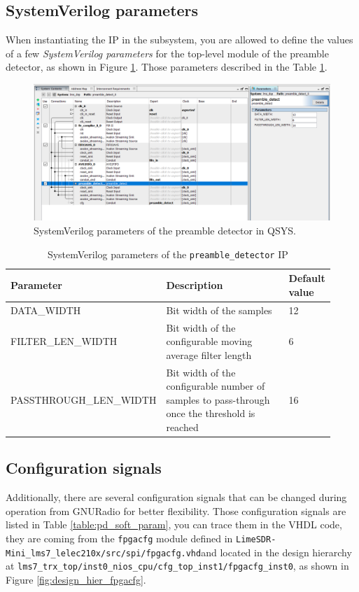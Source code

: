 \subsection{SystemVerilog parameters}
When instantiating the IP in the subsystem, you are allowed to define the values of a few \textit{SystemVerilog parameters} for the top-level module of the preamble detector, as shown in Figure \ref{fig:pd_hard_param}. Those parameters described in the Table \ref{table:pd_hard_param}.

\begin{figure}[!h]
    \centering
    \includegraphics[width=\linewidth]{figures/preamble_detect_qsys_config.PNG}
    \caption{SystemVerilog parameters of the preamble detector in QSYS.}
    \label{fig:pd_hard_param}
\end{figure}

\begin{table}[!h]
\centering
\begin{tabular}{|p{0.36\linewidth}|p{0.48\linewidth}|p{0.08\linewidth}|}
\hline
Parameter & Description & Default value \\
\hline
\textsc{DATA\_WIDTH} & Bit width of the samples & 12 \\
\hline
\textsc{FILTER\_LEN\_WIDTH} & Bit width of the configurable moving average filter length & 6 \\
\hline
\textsc{PASSTHROUGH\_LEN\_WIDTH} & Bit width of the configurable number of samples to pass-through once the threshold is reached & 16 \\
\hline
\end{tabular}
\caption{SystemVerilog parameters of the \texttt{preamble\_detector} IP}
\label{table:pd_hard_param}
\end{table}

\subsection{Configuration signals}
\begin{sloppypar}
Additionally, there are several configuration signals that can be changed during operation from GNURadio for better flexibility. Those configuration signals are listed in Table \ref{table:pd_soft_param}, you can trace them in the VHDL code, they are coming from the \texttt{fpgacfg} module defined in \texttt{LimeSDR-Mini\_lms7\_lelec210x/src/spi/fpgacfg.vhd}and located in the design hierarchy at \texttt{lms7\_trx\_top/inst0\_nios\_cpu/cfg\_top\_inst1/fpgacfg\_inst0}, as shown in Figure \ref{fig:design_hier_fpgacfg}.
\end{sloppypar}

